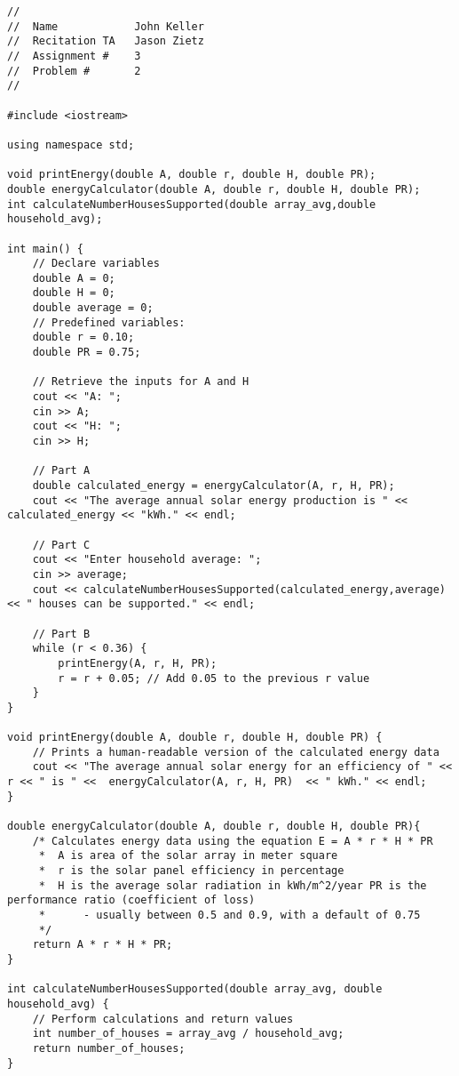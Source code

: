 \documentclass{article}
\begin{document}
\begin{lstlisting}
//
//  Name            John Keller
//  Recitation TA   Jason Zietz
//  Assignment #    3
//  Problem #       2
//

#include <iostream>

using namespace std;

void printEnergy(double A, double r, double H, double PR);
double energyCalculator(double A, double r, double H, double PR);
int calculateNumberHousesSupported(double array_avg,double household_avg);

int main() {
    // Declare variables
    double A = 0;
    double H = 0;
    double average = 0;
    // Predefined variables:
    double r = 0.10;
    double PR = 0.75;
    
    // Retrieve the inputs for A and H
    cout << "A: ";
    cin >> A;
    cout << "H: ";
    cin >> H;
    
    // Part A
    double calculated_energy = energyCalculator(A, r, H, PR);
    cout << "The average annual solar energy production is " << calculated_energy << "kWh." << endl;
    
    // Part C
    cout << "Enter household average: ";
    cin >> average;
    cout << calculateNumberHousesSupported(calculated_energy,average) << " houses can be supported." << endl;
    
    // Part B
    while (r < 0.36) {
        printEnergy(A, r, H, PR);
        r = r + 0.05; // Add 0.05 to the previous r value
    }
}

void printEnergy(double A, double r, double H, double PR) {
    // Prints a human-readable version of the calculated energy data
    cout << "The average annual solar energy for an efficiency of " <<  r << " is " <<  energyCalculator(A, r, H, PR)  << " kWh." << endl;
}

double energyCalculator(double A, double r, double H, double PR){
    /* Calculates energy data using the equation E = A * r * H * PR
     *  A is area of the solar array in meter square
     *  r is the solar panel efficiency in percentage
     *  H is the average solar radiation in kWh/m^2/year PR is the performance ratio (coefficient of loss)
     *      - usually between 0.5 and 0.9, with a default of 0.75
     */
    return A * r * H * PR;
}

int calculateNumberHousesSupported(double array_avg, double household_avg) {
    // Perform calculations and return values
    int number_of_houses = array_avg / household_avg;
    return number_of_houses;
}

\end{lstlisting}
\end{document}
